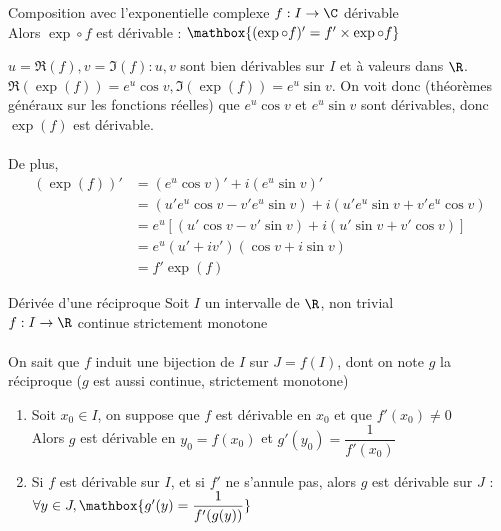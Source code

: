 \documentclass[12pt,a4paper]{report}
\begin{document}
\begin{theoreme}{Composition avec l'exponentielle complexe}{}
$f:I \to \C$ dérivable \\
Alors $\exp \circ f$ est dérivable : $\mathbox{(\exp \circ f)'=f' \times \exp \circ f}$
\end{theoreme}

\begin{demo}{}
$u = \Re(f), v = \Im(f) : u,v$ sont bien dérivables sur $I$ et à valeurs dans $\R$. \\
$\Re(\exp(f)) = e^{u}\cos v, \Im(\exp(f)) = e^{u}\sin v$. On voit donc (théorèmes généraux sur les fonctions réelles) que $e^{u} \cos v$ et $e^{u}\sin v$ sont dérivables, donc $\exp(f)$ est dérivable. \\ \\
De plus, 
\begin{align*}
(\exp(f))' &= (e^{u}\cos v)' + i (e^{u}\sin v)' \\
&=(u'e^{u}\cos v - v'e^{u}\sin v) + i (u'e^{u}\sin v + v'e^{u} \cos v) \\
&=e^{u}\left[(u'\cos v - v' \sin v) + i (u' \sin v + v' \cos v)\right] \\
&= e^{u} (u'+iv')(\cos v + i \sin v) \\
&= f'\exp(f)
\end{align*}
\end{demo}

\begin{theoreme}{Dérivée d'une réciproque}{}
Soit $I$ un intervalle de $\R$, non trivial \\
$f: I \to \R$ continue strictement monotone \\
\\
On sait que $f$ induit une bijection de $I$ sur $J=f(I)$, dont on note $g$ la réciproque ($g$ est aussi continue, strictement monotone)
\begin{enumerate}
    \item Soit $x_0 \in I$, on suppose que $f$ est dérivable en $x_0$ et que $f'(x_0) \neq 0$\\
    Alors $g$ est dérivable en $y_0 = f(x_0)$ et $g'(y_0)=\dfrac{1}{f'(x_0)}$
    \item Si $f$ est dérivable sur $I$, et si $f'$ ne s'annule pas, alors $g$ est dérivable sur $J$ :\\ $\forall y \in J, \mathbox{g'(y)=\dfrac{1}{f'(g(y))}}$
\end{enumerate}
\end{theoreme}
\end{document}

